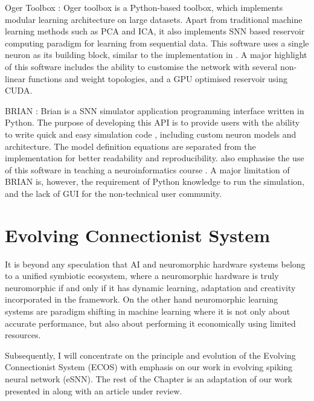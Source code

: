 Oger Toolbox \citep{pecevskioger}: Oger toolbox is a Python-based toolbox, which implements modular learning architecture on large datasets. Apart from traditional machine learning methods such as PCA and ICA, it also implements SNN based reservoir computing paradigm for learning from sequential data. This software uses a single neuron as its building block, similar to the implementation in \citep{eppler2008pynest}. A major highlight of this software includes the ability to customise the network with several non-linear functions and weight topologies, and a GPU optimised reservoir using CUDA.

BRIAN \citep{goodman2009brian,goodman2010code}: Brian is a SNN simulator application programming interface written in Python. The purpose of developing this API is to provide users with the ability to write quick and easy simulation code \citep{goodman2010code}, including custom neuron models and architecture. The model definition equations are separated from the implementation for better readability and reproducibility. \citet{goodman2009brian} also emphasise the use of this software in teaching a neuroinformatics course \citep{diesmann1999stable}. A major limitation of BRIAN is, however, the requirement of Python knowledge to run the simulation, and the lack of GUI for the non-technical user community. 



\section{Evolving Connectionist System}
It is beyond any speculation that AI and neuromorphic hardware systems belong to a unified symbiotic ecosystem, where a neuromorphic hardware is truly neuromorphic if and only if it has dynamic learning, adaptation and creativity incorporated in the framework. On the other hand neuromorphic learning systems are paradigm shifting in machine learning where it is not only about accurate performance, but also about performing it economically using limited resources.

Subsequently, I will concentrate on the principle and evolution of the Evolving Connectionist System (ECOS) with emphasis on our work in evolving spiking neural network (eSNN). The rest of the Chapter is an adaptation of our work presented in \citep{arya2016cyber} along with an article under review. 

